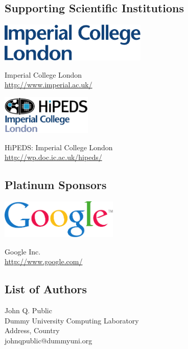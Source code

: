 \documentclass[a4paper,UKenglish]{oasicsmaster-v2016}
\begin{document}
\section*{Supporting Scientific Institutions}
\bigskip

\noindent
\begin{minipage}{0.6\textwidth}
  \begin{center}
  \includegraphics[height=5em]{imperial}
  \end{center}
\end{minipage}
\begin{minipage}{0.39\textwidth}
  Imperial College London\\
  \url{http://www.imperial.ac.uk/}
\end{minipage}
\bigskip

\noindent
\begin{minipage}{0.6\textwidth}
  \begin{center}
  \includegraphics[height=5em]{hipeds}
  \end{center}
\end{minipage}
\begin{minipage}{0.39\textwidth}
  HiPEDS: Imperial College London\\
  \url{http://wp.doc.ic.ac.uk/hipeds/}
\end{minipage}

\bigskip
\section*{Platinum Sponsors}
\bigskip

\noindent
\begin{minipage}{0.6\textwidth}
  \begin{center}
  \includegraphics[height=5em]{google}
  \end{center}
\end{minipage}
\begin{minipage}{0.39\textwidth}
  Google Inc.\\
  \url{http://www.google.com/}
\end{minipage}


\begin{participants}
\chapter[Authors]{List of Authors}
\participant John Q. Public\\ 
  Dummy University Computing Laboratory\\
  Address, Country\\
  johnqpublic@dummyuni.org

\end{participants} 
\end{document}
